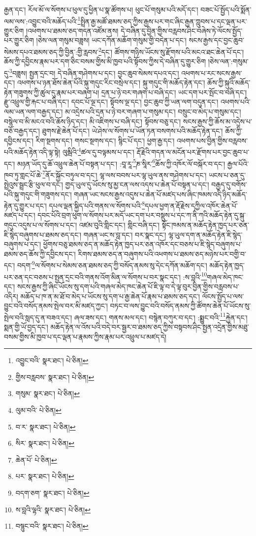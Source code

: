 རྒྱན་དང་། རོལ་མོ་ལ་སོགས་པ་ཕུལ་དུ་ཕྱིན་པ་སྣ་ཚོགས་པ། ཕུང་པོ་གསུམ་པའི་མདོ་དང་། བཟང་པོ་སྤྱོད་པའི་སྨོན་ལམ་ལས་:འབྱུང་བའི་མཆོད་པའི་\footnote{འབྱུང་བའི་  སྣར་ཐང་།  པེ་ཅིན། }སྤྲིན་རྒྱ་མཚོ་ཐམས་ཅད་ཀྱིས་རྒྱས་པར་གང་ཞིང་རྒྱན་ཀླུབས་པ་དང་ལྡན་པར་གྱུར་ཅིག །འཕགས་པ་ཐམས་ཅད་གདན་འཛོམ་ནས། དེ་བཞིན་དུ་བྱིན་གྱིས་བརླབས་ཤིང་བཞེས་ཏེ་ལོངས་སྤྱོད་པར་གྱུར་ཅིག །ཅེས་ལན་གསུམ་བཟླས། ཡང་དཀོན་མཆོག་གསུམ་གྱི་བདེན་པ་དང་། སངས་རྒྱས་དང་བྱང་ཆུབ་སེམས་དཔའ་ཐམས་ཅད་ཀྱི་བྱིན་:གྱི་རླབས་\footnote{གྱིས་བརླབས་  སྣར་ཐང་།  པེ་ཅིན། }དང་། ཚོགས་གཉིས་ཡོངས་སུ་རྫོགས་པའི་མངའ་ཐང་ཆེན་པོ་དང་། ཆོས་ཀྱི་དབྱིངས་རྣམ་པར་དག་ཅིང་བསམ་གྱིས་མི་ཁྱབ་པའི་སྟོབས་ཀྱིས་དེ་བཞིན་དུ་གྱུར་ཅིག །ཅེས་ལན་:གསུམ་དུ་\footnote{གསུམ་  སྣར་ཐང་།  པེ་ཅིན། }བཟླས། སྤྱན་དྲང་བ། དེ་བཞིན་གཤེགས་པ་དང་། བྱང་ཆུབ་སེམས་དཔའ་དང་། འཕགས་པ་རང་སངས་རྒྱས་དང་། འཕགས་པ་ཉན་ཐོས་ཆེན་པོའི་སྐུ་གདུང་རིང་བསྲེལ་དང་། སྐུ་གདུང་གི་མཆོད་རྟེན་དང་། ཆོས་ཀྱི་སྐུའི་མཆོད་རྟེན་གཟུགས་ཀྱི་ཚུལ་དུ་རྣམ་པར་བཞག་པ། དྲན་པ་ཉེ་བར་གཞག་པ་བཞི་དང་། ཡང་དག་པར་སྤོང་བ་བཞི་དང་། རྫུ་འཕྲུལ་གྱི་རྐང་པ་བཞི་དང་། དབང་པོ་ལྔ་དང་། སྟོབས་ལྔ་དང་། བྱང་ཆུབ་ཀྱི་ཡན་ལག་བདུན་དང་། འཕགས་པའི་ལམ་ཡན་ལག་བརྒྱད་དང་། མ་འདྲེས་པའི་དྲན་པ་ཉེ་བར་གཞག་པ་གསུམ་དང་། བསྲུང་བ་མེད་པ་གསུམ་དང་། བསྙེལ་བ་མི་མངའ་བའི་ཆོས་ཉིད་དང་། མི་འཇིགས་པ་བཞི་དང་། སྟོབས་བཅུ་དང་། སངས་རྒྱས་ཀྱི་ཆོས་མ་འདྲེས་པ་བཅོ་བརྒྱད་དང་། ཐུགས་རྗེ་ཆེན་པོ་དང་། ཡེ་ཤེས་ལ་སོགས་པ་ཡོན་ཏན་བསགས་པའི་མཆོད་རྟེན་དང་། ཆོས་ཀྱི་དབྱིངས་དང་། རིག་སྔགས་དང་། གསང་སྔགས་དང་། སྙིང་པོ་དང་། ཕྱག་རྒྱ་དང་། འཕགས་པས་བྱིན་གྱིས་བརླབས་པའི་མཆོད་རྟེན་འདི་ལྟ་སྟེ། ལུམྦིའི་\footnote{ལུམ་བའི་  པེ་ཅིན། }ཚལ་དུ་བལྟམས་པ་དང་། རྡོ་རྗེའི་གདན་ལ་མངོན་པར་རྫོགས་པར་བྱང་ཆུབ་པ་དང་། མཉན་ཡོད་དུ་ཆོ་འཕྲུལ་ཆེན་པོ་བསྟན་པ་དང་། :བཱ་རཱ་\footnote{བ་ར་  སྣར་ཐང་།  པེ་ཅིན། }ཎ་སཱིར་\footnote{སིར་  སྣར་ཐང་།  པེ་ཅིན། }ཆོས་ཀྱི་འཁོར་ལོ་བསྐོར་བ་དང་། རྒྱལ་པོའི་ཁབ་ཏུ་གླང་པོ་ཆེ་\footnote{ཆེན་པོ་  པེ་ཅིན། }ནོར་སྐྱོང་བཏུལ་བ་དང་། ལྷ་ལས་བབས་པར་ལྷ་ཡུལ་ནས་གཤེགས་པ་དང་། ཡངས་པ་ཅན་དུ་སྤྲེའུས་སྦྲང་རྩི་ཕུལ་བ་དང་། གྱད་ཡུལ་དུ་ཡོངས་སུ་མྱ་ངན་ལས་འདས་པ་ཆེན་པོ་བསྟན་པ་དང་། བརྒྱད་དུ་བགོས་པའི་སྐུ་གདུང་གི་གཟུགས་དང་། གཞན་ཡང་སངས་རྒྱས་འདུས་པ་ཆེན་པོ་མཛད་པས་ཞིང་ཁམས་འདི་ཉིད་མཆོད་རྟེན་དུ་གྱུར་པ་དང་། དཔལ་ལྡན་སྐྱིད་པའི་གནས་ལ་སོགས་པའི་\footnote{པར་  སྣར་ཐང་།  པེ་ཅིན། }དཔལ་ཕྱག་ན་རྡོ་རྗེས་དཀྱིལ་འཁོར་ཆེན་པོ་མཛད་པ་དང་། དབང་པོའི་བྲག་ཕུག་ལ་སོགས་པར་མདོ་ཡང་དག་པར་བསྡུས་པ་དང་ཀ་ནི་ཀའི་མཆོད་རྟེན་དུ་སྐུ་གདུང་འདུས་པ་ལ་སོགས་པ་དང་། འཛམ་བུའི་གླིང་དང་། གླིང་བཞི་དང་། སྟོང་ཁམས་ན་མཆོད་རྟེན་ཁྱད་པར་ཅན་ཇི་སྙེད་བཞུགས་པ་ཐམས་ཅད་དང་། གཞན་ཡང་ས་བླ་དང་། བར་སྣང་དང་། ལྷ་ཡུལ་དག་ན་མཆོད་རྟེན་ཇི་སྙེད་བཞུགས་པ་དང་། ཕྱོགས་བཅུ་ཐམས་ཅད་ན་མཆོད་རྟེན་ཁྱད་པར་ཅན་འཁོར་དང་བཅས་པ་ཇི་སྙེད་བཞུགས་པ་ཐམས་ཅད་ཆོས་ཀྱི་དབྱིངས་དང་། རིགས་ཐམས་ཅད་ན་བཞུགས་པའི་འཕགས་པ་ཐམས་ཅད་མཉེས་པར་བགྱི་བ་དང་། བདག་\footnote{བདག་ཅག་  སྣར་ཐང་།  པེ་ཅིན། }ལ་སོགས་པ་སེམས་ཅན་ཐམས་ཅད་ཀྱི་བསོད་ནམས་སུ་དེང་དཀོན་མཆོག་དང་། མཆོད་རྟེན་ཁྱད་པར་ཅན་དང་བཅས་པ་སྤྱན་དྲང་བའི་གནས་འོག་མིན་ལ་སོགས་པ་བར་སྣང་དང་། :ས་བླའི་\footnote{ས་བླའི་ལྷའི་  སྣར་ཐང་།  པེ་ཅིན། }གཞལ་མེད་ཁང་དང་། སངས་རྒྱས་ཀྱི་ཞིང་ཡོངས་སུ་དག་པའི་གཞལ་མེད་ཁང་ཆེན་པོ་ཇི་ལྟ་བ་དེ་ལྟ་བུར་བྱིན་གྱིས་བརླབས་པ་འདིར། མཆོད་པ་ཁ་ན་མ་ཐོ་བ་མེད་པ་ཡོངས་སུ་དག་པ་རྒྱ་ཆེན་པོ་རྣམ་པ་ཐམས་ཅད་དང་། ལོངས་སྤྱོད་པ་ལས་བྱུང་བའི་བསོད་ནམས་སྤེལ་བར་མི་མཛད་ཀྱང་། བཏང་བ་ལས་བྱུང་བའི་བསོད་ནམས་ཀྱི་ཚོགས་ཆེན་པོ་ཡོངས་སུ་སྤེལ་བའི་སླད་དུ་ན་བཟའ་དང་། ཞལ་ཟས་དང་། གནས་མལ་དང་། བསྙེན་བཀུར་བ་དང་། :སྨྱུང་བའི་\footnote{བསྙུང་བའི་  སྣར་ཐང་།  པེ་ཅིན། }རྐྱེན་དང་། སྨན་གྱི་ཡོ་བྱད་དང་། མཆོད་རྟེན་ལ་འོས་པའི་བདེ་བར་སྦྱར་བ་ཐམས་ཅད་ཀྱིས་བསྟབས་ཤིང་སྤྱན་འདྲེན་གྱིས་མཐུ་བསམ་གྱིས་མི་ཁྱབ་པ་དང་ལྡན་པ་རྣམས་ཀྱིས་རྣམ་པར་འཕྲུལ་པ་མཛད་དེ། 